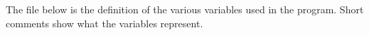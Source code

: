 The file below is the definition of the various variables used in the program. Short comments show what the variables represent.
